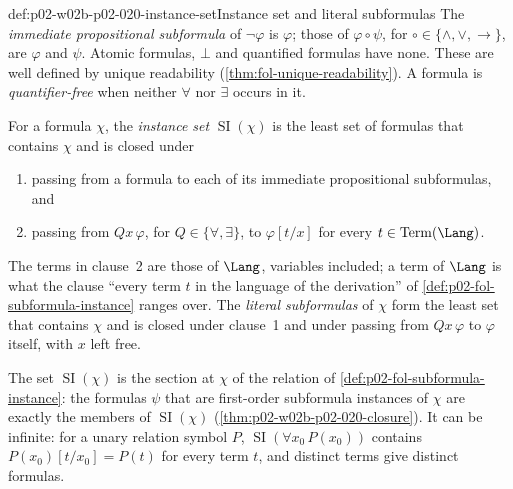 \begin{hbconvention}{def:p02-w02b-p02-020-instance-set}{Instance set and literal subformulas}
The \emph{immediate propositional subformula} of \(\neg\varphi\) is
\(\varphi\); those of \(\varphi\circ\psi\), for
\(\circ\in\{\land,\lor,\to\}\), are \(\varphi\) and \(\psi\).  Atomic formulas,
\(\bot\) and quantified formulas have none.  These are well defined by unique
readability (\cref{thm:fol-unique-readability}).  A formula is
\emph{quantifier-free} when neither \(\forall\) nor \(\exists\) occurs in it.

For a formula \(\chi\), the \emph{instance set} \(\operatorname{SI}(\chi)\) is
the least set of formulas that contains \(\chi\) and is closed under
\begin{enumerate}
  \item passing from a formula to each of its immediate propositional
        subformulas, and
  \item passing from \(Qx\,\varphi\), for \(Q\in\{\forall,\exists\}\), to
        \(\varphi[t/x]\) for every \(t\in\operatorname{Term}(\Lang)\).
\end{enumerate}
The terms in clause~2 are those of \(\Lang\), variables included; a term of
\(\Lang\) is what the clause ``every term \(t\) in the language of the
derivation'' of \cref{def:p02-fol-subformula-instance} ranges over.  The
\emph{literal subformulas} of \(\chi\) form the least set that contains
\(\chi\) and is closed under clause~1 and under passing from \(Qx\,\varphi\)
to \(\varphi\) itself, with \(x\) left free.
\end{hbconvention}

The set \(\operatorname{SI}(\chi)\) is the section at \(\chi\) of the relation
of \cref{def:p02-fol-subformula-instance}: the formulas \(\psi\) that are
first-order subformula instances of \(\chi\) are exactly the members of
\(\operatorname{SI}(\chi)\) (\cref{thm:p02-w02b-p02-020-closure}).  It can be infinite: for a unary
relation symbol \(P\), \(\operatorname{SI}(\forall x_0\,P(x_0))\) contains
\(P(x_0)[t/x_0]=P(t)\) for every term \(t\), and distinct terms give distinct
formulas.

